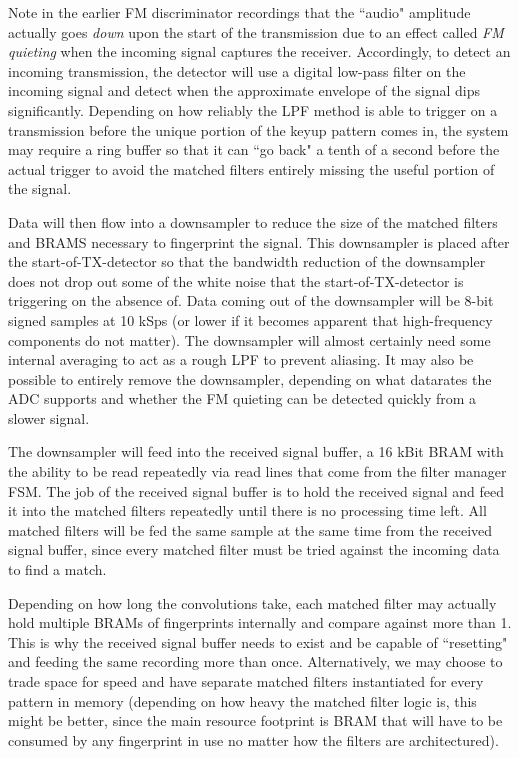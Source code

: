 \documentclass{article}
\begin{document}
Note in the earlier FM discriminator recordings that the ``audio" amplitude actually goes \emph{down} upon the start of the transmission due to an effect called \emph{FM quieting} when the incoming signal captures the receiver. Accordingly, to detect an incoming transmission, the detector will use a digital low-pass filter on the incoming signal and detect when the approximate envelope of the signal dips significantly. Depending on how reliably the LPF method is able to trigger on a transmission before the unique portion of the keyup pattern comes in, the system may require a ring buffer so that it can ``go back" a tenth of a second before the actual trigger to avoid the matched filters entirely missing the useful portion of the signal.

Data will then flow into a downsampler to reduce the size of the matched filters and BRAMS necessary to fingerprint the signal. This downsampler is placed after the start-of-TX-detector so that the bandwidth reduction of the downsampler does not drop out some of the white noise that the start-of-TX-detector is triggering on the absence of. Data coming out of the downsampler will be 8-bit signed samples at 10 kSps (or lower if it becomes apparent that high-frequency components do not matter). The downsampler will almost certainly need some internal averaging to act as a rough LPF to prevent aliasing. It may also be possible to entirely remove the downsampler, depending on what datarates the ADC supports and whether the FM quieting can be detected quickly from a slower signal.

The downsampler will feed into the received signal buffer, a 16 kBit BRAM with the ability to be read repeatedly via read lines that come from the filter manager FSM. The job of the received signal buffer is to hold the received signal and feed it into the matched filters repeatedly until there is no processing time left. All matched filters will be fed the same sample at the same time from the received signal buffer, since every matched filter must be tried against the incoming data to find a match.

Depending on how long the convolutions take, each matched filter may actually hold multiple BRAMs of fingerprints internally and compare against more than 1. This is why the received signal buffer needs to exist and be capable of ``resetting" and feeding the same recording more than once. Alternatively, we may choose to trade space for speed and have separate matched filters instantiated for every pattern in memory (depending on how heavy the matched filter logic is, this might be better, since the main resource footprint is BRAM that will have to be consumed by any fingerprint in use no matter how the filters are architectured).
\end{document}
